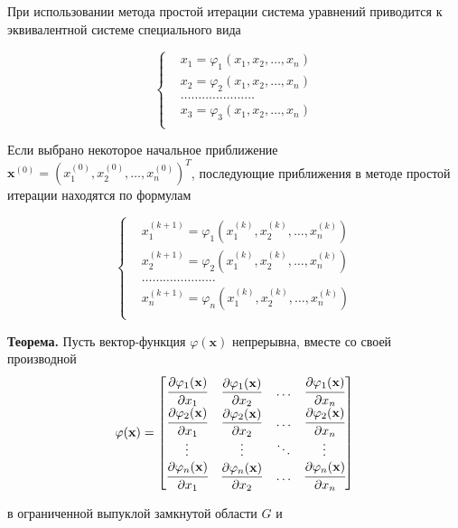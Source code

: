 При использовании метода простой итерации система
уравнений приводится к эквивалентной системе специального вида

 $$\left\{\begin{aligned}
    & x_1 = \varphi_1(x_1, x_2, \dots, x_n) \\ 
    & x_2 = \varphi_2(x_1, x_2, \dots, x_n) \\
    & \dots \dots \dots \dots \dots \dots \dots \\
    & x_3 = \varphi_3(x_1, x_2, \dots, x_n) \\
 \end{aligned}\right.$$

Если выбрано некоторое начальное приближение
$\textbf{x}^{(0)}=(x^{(0)}_1,x^{(0)}_2,\dots,x^{(0)}_n)^T$,
последующие приближения в методе простой итерации находятся по формулам

$$\left\{\begin{aligned}
    & x_1^{(k + 1)} = \varphi_1(x_1^{(k)}, x_2^{(k)}, \dots, x_n^{(k)}) \\ 
    & x_2^{(k + 1)} = \varphi_2(x_1^{(k)}, x_2^{(k)}, \dots, x_n^{(k)}) \\
    & \dots \dots \dots \dots \dots \dots \dots \\
    & x_n^{(k + 1)} = \varphi_n(x_1^{(k)}, x_2^{(k)}, \dots, x_n^{(k)}) \\
 \end{aligned}\right.$$

\textbf{Теорема.} Пусть вектор-функция $\varphi(\textbf{x})$ непрерывна,
вместе со своей производной
$$\varphi(\textbf{x}) = \begin{bmatrix}
    \cfrac{\partial \varphi_1(\textbf{x})}{\partial x_1} &
    \dfrac{\partial \varphi_1(\textbf{x})}{\partial x_2} & \hdots &
    \cfrac{\partial \varphi_1(\textbf{x})}{\partial x_n} \\
    \cfrac{\partial \varphi_2(\textbf{x})}{\partial x_1} &
    \dfrac{\partial \varphi_2(\textbf{x})}{\partial x_2} & \hdots &
    \cfrac{\partial \varphi_2(\textbf{x})}{\partial x_n} \\
    \vdots & \vdots & \ddots & \vdots \\
    \cfrac{\partial \varphi_n(\textbf{x})}{\partial x_1} &
    \dfrac{\partial \varphi_n(\textbf{x})}{\partial x_2} & \hdots &
    \cfrac{\partial \varphi_n(\textbf{x})}{\partial x_n} \\
\end{bmatrix}$$

в ограниченной выпуклой замкнутой области $G$ и

